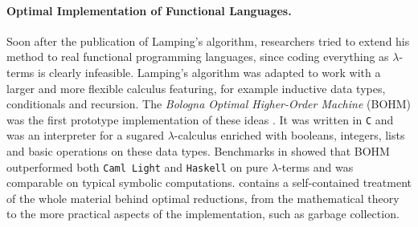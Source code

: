 \begin{LONG}
	\paragraph{Optimal Implementation of Functional Languages.}Soon after the publication of Lamping's algorithm, researchers tried to extend his method to real functional programming languages, since coding everything as $\lambda$-terms is clearly infeasible. Lamping's algorithm was adapted to work with a larger and more flexible calculus featuring, for example inductive data types, conditionals and recursion. The \emph{Bologna Optimal Higher-Order Machine} (BOHM) was the first prototype implementation of these ideas \cite{asperti_bologna_1996}. It was written in \texttt{C} and was an interpreter for a sugared $\lambda$-calculus enriched with booleans, integers, lists and basic operations on these data types. Benchmarks in \cite{asperti_optimal_1998} showed that BOHM outperformed both \texttt{Caml Light} and \texttt{Haskell} on pure $\lambda$-terms and was comparable on typical symbolic computations. \cite{asperti_optimal_1998} contains a self-contained treatment of the whole material behind optimal reductions, from the mathematical theory to the more practical aspects of the implementation, such as garbage collection.
\end{LONG}
